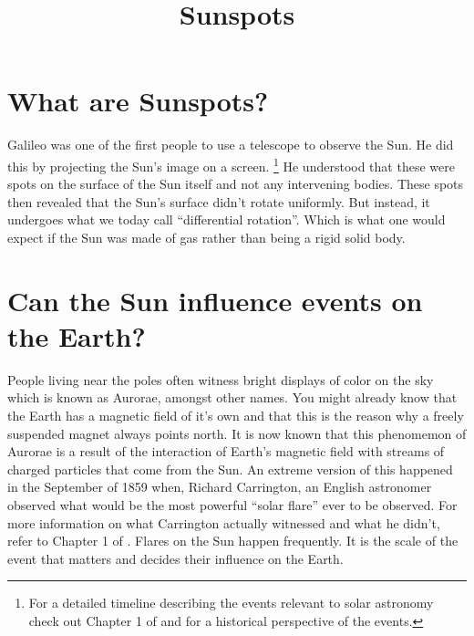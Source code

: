 \documentclass{../template/texnote}
\title{Sunspots}
\begin{document}
    \maketitle {}
\section{What are Sunspots?}
Galileo was one of the first people to use a telescope to observe the Sun.
He did this by projecting the Sun's image on a screen.
\footnote{
    For a detailed timeline describing the events relevant to solar astronomy check out Chapter 1 of  and  for a historical perspective of the events.
}
He understood that these were spots on the surface of the Sun itself and not any intervening bodies.
These spots then revealed that the Sun's surface didn't rotate uniformly.
But instead, it undergoes what we today call ``differential rotation''.
Which is what one would expect if the Sun was made of gas rather than being a rigid solid body.

\section{Can the Sun influence events on the Earth?}
People living near the poles often witness bright displays of color on the sky which is known as Aurorae, amongst other names.
You might already know that the Earth has a magnetic field of it's own and that this is the reason why a freely suspended magnet always points north.
It is now known that this phenomemon of Aurorae is a result of the interaction of Earth's magnetic field with streams of charged particles that come from the Sun.
An extreme version of this happened in the September of 1859 when, Richard Carrington, an English astronomer observed what would be the most powerful ``solar flare'' ever to be observed.
For more information on what Carrington actually witnessed and  what he didn't, refer to Chapter 1 of .
Flares on the Sun happen frequently. It is the scale of the event that matters and decides their influence on the Earth.
\end{document}
